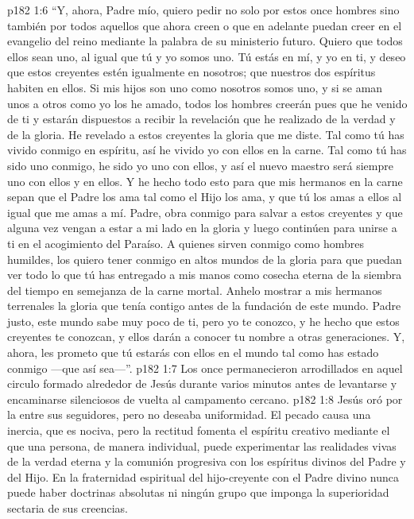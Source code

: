 \vs p182 1:6 “Y, ahora, Padre mío, quiero pedir no solo por estos once hombres sino también por todos aquellos que ahora creen o que en adelante puedan creer en el evangelio del reino mediante la palabra de su ministerio futuro. Quiero que todos ellos sean uno, al igual que tú y yo somos uno. Tú estás en mí, y yo en ti, y deseo que estos creyentes estén igualmente en nosotros; que nuestros dos espíritus habiten en ellos. Si mis hijos son uno como nosotros somos uno, y si se aman unos a otros como yo los he amado, todos los hombres creerán pues que he venido de ti y estarán dispuestos a recibir la revelación que he realizado de la verdad y de la gloria. He revelado a estos creyentes la gloria que me diste. Tal como tú has vivido conmigo en espíritu, así he vivido yo con ellos en la carne. Tal como tú has sido uno conmigo, he sido yo uno con ellos, y así el nuevo maestro será siempre uno con ellos y en ellos. Y he hecho todo esto para que mis hermanos en la carne sepan que el Padre los ama tal como el Hijo los ama, y que tú los amas a ellos al igual que me amas a mí. Padre, obra conmigo para salvar a estos creyentes y que alguna vez vengan a estar a mi lado en la gloria y luego continúen para unirse a ti en el acogimiento del Paraíso. A quienes sirven conmigo como hombres humildes, los quiero tener conmigo en altos mundos de la gloria para que puedan ver todo lo que tú has entregado a mis manos como cosecha eterna de la siembra del tiempo en semejanza de la carne mortal. Anhelo mostrar a mis hermanos terrenales la gloria que tenía contigo antes de la fundación de este mundo. Padre justo, este mundo sabe muy poco de ti, pero yo te conozco, y he hecho que estos creyentes te conozcan, y ellos darán a conocer tu nombre a otras generaciones. Y, ahora, les prometo que tú estarás con ellos en el mundo tal como has estado conmigo ---que así sea---”.
\vs p182 1:7 Los once permanecieron arrodillados en aquel circulo formado alrededor de Jesús durante varios minutos antes de levantarse y encaminarse silenciosos de vuelta al campamento cercano.
\vs p182 1:8 \pc Jesús oró por la  entre sus seguidores, pero no deseaba uniformidad. El pecado causa una inercia, que es nociva, pero la rectitud fomenta el espíritu creativo mediante el que una persona, de manera individual, puede experimentar las realidades vivas de la verdad eterna y la comunión progresiva con los espíritus divinos del Padre y del Hijo. En la fraternidad espiritual del hijo\hyp{}creyente con el Padre divino nunca puede haber doctrinas absolutas ni ningún grupo que imponga la superioridad sectaria de sus creencias.
